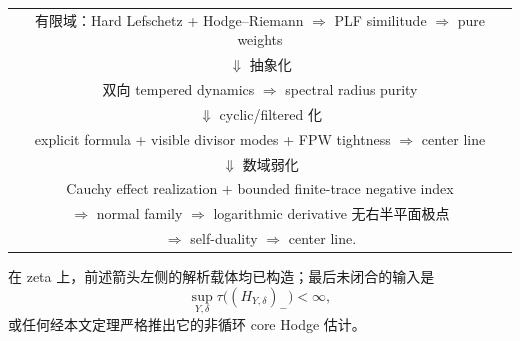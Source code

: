 \documentclass[UTF8,11pt,a4paper]{ctexart}
\theoremstyle{definition}
\theoremstyle{remark}
\newcommand{\1}{\mathbf 1}
\begin{document}
\begin{center}
\begin{tabular}{c}
有限域：Hard Lefschetz + Hodge--Riemann $\Longrightarrow$ PLF similitude $\Longrightarrow$ pure weights\\[4pt]
$\Downarrow$ 抽象化\\[4pt]
双向 tempered dynamics $\Longrightarrow$ spectral radius purity\\[4pt]
$\Downarrow$ cyclic/filtered 化\\[4pt]
explicit formula + visible divisor modes + FPW tightness $\Longrightarrow$ center line\\[4pt]
$\Downarrow$ 数域弱化\\[4pt]
Cauchy effect realization + bounded finite-trace negative index\\
$\Longrightarrow$ normal family $\Longrightarrow$ logarithmic derivative 无右半平面极点\\
$\Longrightarrow$ self-duality $\Longrightarrow$ center line.
\end{tabular}
\end{center}

在 zeta 上，前述箭头左侧的解析载体均已构造；最后未闭合的输入是
\[
 \sup_{Y,\delta}\tau\bigl((H_{Y,\delta})_-\bigr)<\infty,
\]
或任何经本文定理严格推出它的非循环 core Hodge 估计。
\end{document}
